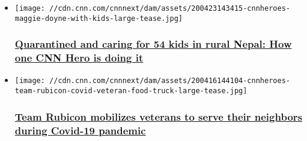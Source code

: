 \begin{itemize}
\item
  \href{/2020/04/23/world/coronavirus-nepal-food-shortage-quarantined-54-kids-cnnheroes/index.html}{}

  \texttt{[image: //cdn.cnn.com/cnnnext/dam/assets/200423143415-cnnheroes-maggie-doyne-with-kids-large-tease.jpg]}

  \hypertarget{quarantined-and-caring-for-54-kids-in-rural-nepal-how-one-cnn-hero-is-doing-it}{%
  \subsubsection{\texorpdfstring{\href{/2020/04/23/world/coronavirus-nepal-food-shortage-quarantined-54-kids-cnnheroes/index.html}{Quarantined
  and caring for 54 kids in rural Nepal: How one CNN Hero is doing
  it}}{Quarantined and caring for 54 kids in rural Nepal: How one CNN Hero is doing it}}\label{quarantined-and-caring-for-54-kids-in-rural-nepal-how-one-cnn-hero-is-doing-it}}
\end{itemize}

\begin{itemize}
\item
  \href{/2020/04/16/us/coronavirus-team-rubicon-veterans-helping-neighbors-cnnheroes/index.html}{}

  \texttt{[image: //cdn.cnn.com/cnnnext/dam/assets/200416144104-cnnheroes-team-rubicon-covid-veteran-food-truck-large-tease.jpg]}

  \hypertarget{team-rubicon-mobilizes-veterans-to-serve-their-neighbors-during-covid-19-pandemic}{%
  \subsubsection{\texorpdfstring{\href{/2020/04/16/us/coronavirus-team-rubicon-veterans-helping-neighbors-cnnheroes/index.html}{Team
  Rubicon mobilizes veterans to serve their neighbors during Covid-19
  pandemic}}{Team Rubicon mobilizes veterans to serve their neighbors during Covid-19 pandemic}}\label{team-rubicon-mobilizes-veterans-to-serve-their-neighbors-during-covid-19-pandemic}}
\end{itemize}

